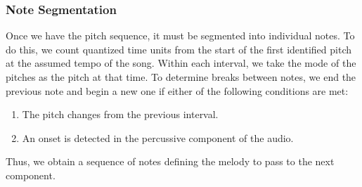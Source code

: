\subsubsection{Note Segmentation}

Once we have the pitch sequence, it must be segmented into individual notes. To do this, we count quantized time units from the start of the first identified pitch at the assumed tempo of the song. Within each interval, we take the mode of the pitches as the pitch at that time. To determine breaks between notes, we end the previous note and begin a new one if either of the following conditions are met:
\begin{enumerate}
    \item The pitch changes from the previous interval.
    \item An onset is detected in the percussive component of the audio.
\end{enumerate}
Thus, we obtain a sequence of notes defining the melody to pass to the next component.
